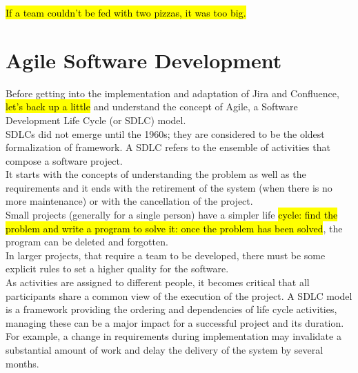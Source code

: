 \begin{savequote}[75mm]
\hl{If a team couldn’t be fed with two pizzas, it was too big.}
\end{savequote}


\chapter{Agile Software Development}
\label{chapter_3}

Before getting into the implementation and adaptation of Jira and Confluence, \hl{let's back up a little} and understand the concept of Agile, a Software Development Life Cycle (or SDLC) model.\\
SDLCs did not emerge until the 1960s; they are considered to be the oldest formalization of framework.
A SDLC refers to the ensemble of activities that compose a software project.\\
It starts with the concepts of understanding the problem as well as the requirements and it ends with the retirement of the system (when there is no more maintenance) or with the cancellation of the project.\\
Small projects (generally for a single person) have a simpler life \hl{cycle: find the problem and write a program to solve it: once the problem has been solved}, the program can be deleted and forgotten.\\
In larger projects, that require a team to be developed, there must be some explicit rules to set a higher quality for the software.\\
As activities are assigned to different people, it becomes critical that all participants share a common view of the execution of the project.
A SDLC model is a framework providing the ordering and dependencies of life cycle activities, managing these can be a major impact for a successful project and its duration.\\
For example, a change in requirements during implementation may invalidate a substantial amount of work and delay the delivery of the system by several months.
